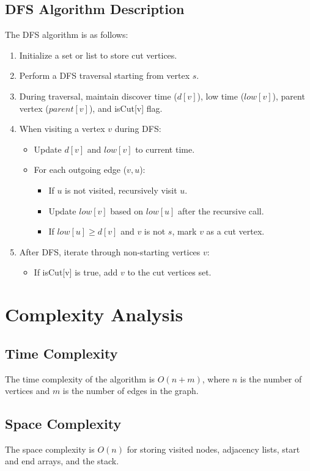 \documentclass{article}
\begin{document}
\subsection{DFS Algorithm Description}
The DFS algorithm is as follows:
\begin{enumerate}
    \item Initialize a set or list to store cut vertices.
    \item Perform a DFS traversal starting from vertex $s$.
    \item During traversal, maintain discover time ($d[v]$), low time ($low[v]$), parent vertex ($parent[v]$), and isCut[v] flag.
    \item When visiting a vertex $v$ during DFS:
    \begin{itemize}
        \item Update $d[v]$ and $low[v]$ to current time.
        \item For each outgoing edge ($v, u$):
        \begin{itemize}
            \item If $u$ is not visited, recursively visit $u$.
            \item Update $low[v]$ based on $low[u]$ after the recursive call.
            \item If $low[u] \geq d[v]$ and $v$ is not $s$, mark $v$ as a cut vertex.
        \end{itemize}
    \end{itemize}
    \item After DFS, iterate through non-starting vertices $v$:
    \begin{itemize}
        \item If isCut[v] is true, add $v$ to the cut vertices set.
    \end{itemize}
\end{enumerate}

\section{Complexity Analysis}
\subsection{Time Complexity}
The time complexity of the algorithm is $O(n + m)$, where $n$ is the number of vertices and $m$ is the number of edges in the graph.

\subsection{Space Complexity}
The space complexity is $O(n)$ for storing visited nodes, adjacency lists, start and end arrays, and the stack.
\end{document}
